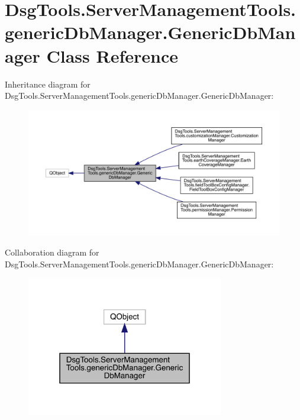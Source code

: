 \hypertarget{class_dsg_tools_1_1_server_management_tools_1_1generic_db_manager_1_1_generic_db_manager}{}\section{Dsg\+Tools.\+Server\+Management\+Tools.\+generic\+Db\+Manager.\+Generic\+Db\+Manager Class Reference}
\label{class_dsg_tools_1_1_server_management_tools_1_1generic_db_manager_1_1_generic_db_manager}


Inheritance diagram for Dsg\+Tools.\+Server\+Management\+Tools.\+generic\+Db\+Manager.\+Generic\+Db\+Manager\+:
\nopagebreak
\begin{figure}[H]
\begin{center}
\leavevmode
\includegraphics[width=350pt]{class_dsg_tools_1_1_server_management_tools_1_1generic_db_manager_1_1_generic_db_manager__inherit__graph}
\end{center}
\end{figure}


Collaboration diagram for Dsg\+Tools.\+Server\+Management\+Tools.\+generic\+Db\+Manager.\+Generic\+Db\+Manager\+:
\nopagebreak
\begin{figure}[H]
\begin{center}
\leavevmode
\includegraphics[width=244pt]{class_dsg_tools_1_1_server_management_tools_1_1generic_db_manager_1_1_generic_db_manager__coll__graph}
\end{center}
\end{figure}
